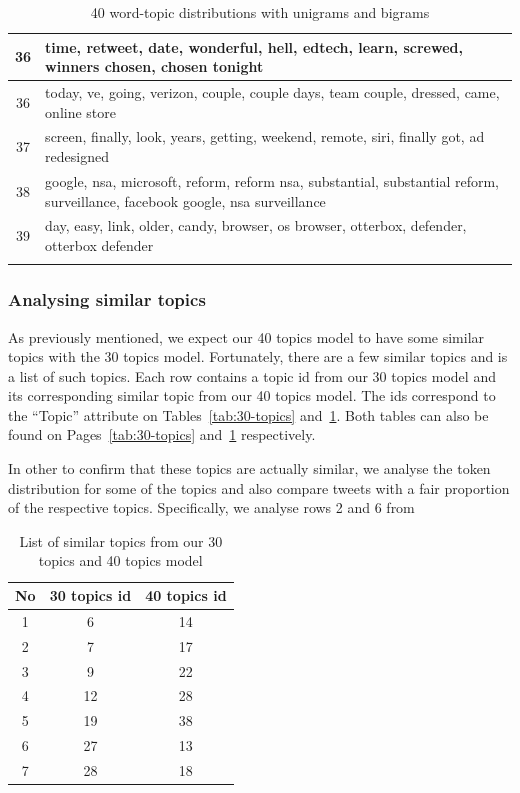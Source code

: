 \begin{longtable}{c p{16cm}}
   36   & time, retweet, date, wonderful, hell, edtech, learn, screwed, winners chosen, chosen tonight \\ \midrule
   36   & today, ve, going, verizon, couple, couple days, team couple, dressed, came, online store \\ \midrule
   37   & screen, finally, look, years, getting, weekend, remote, siri, finally got, ad redesigned \\ \midrule
   38   & google, nsa, microsoft, reform, reform nsa, substantial, substantial reform, surveillance, facebook google, nsa surveillance \\ \midrule
   39   & day, easy, link, older, candy, browser, os browser, otterbox, defender, otterbox defender \\ \bottomrule
\caption{40 word-topic distributions with unigrams and bigrams}
\label{tab:40-topics}
\end{longtable}


\subsubsection{Analysing similar topics}
\label{sec:analysing-topic-similarities}
As previously mentioned, we expect our 40 topics model to have some similar topics with the 30
topics model. Fortunately, there are a few similar topics and  is a list
of such topics. Each row contains a topic id from our 30 topics model and its corresponding similar
topic from our 40 topics model. The ids correspond to the ``Topic'' attribute on
Tables~\ref{tab:30-topics} and~\ref{tab:40-topics}. Both tables can also be found on
Pages~\ref{tab:30-topics} and~\ref{tab:40-topics} respectively.

In other to confirm that these topics are actually similar, we analyse the token distribution
for some of the topics and also compare tweets with a fair proportion of the respective topics.
Specifically, we analyse rows 2 and 6 from 

\begin{table}
  \centering
  \begin{tabular}{c c c} \toprule
    No & 30 topics id & 40 topics id \\ \midrule
    1  &     6       &    14 \\ \midrule
    2  &     7       &    17 \\ \midrule
    3  &     9       &    22 \\ \midrule
    4  &     12      &    28 \\ \midrule
    5  &     19      &    38 \\ \midrule
    6  &     27      &    13 \\ \midrule
    7  &     28      &    18 \\ \bottomrule
  \end{tabular}
  \caption{List of similar topics from our 30 topics and 40 topics model}
  \label{tab:similar-topics}
\end{table}



